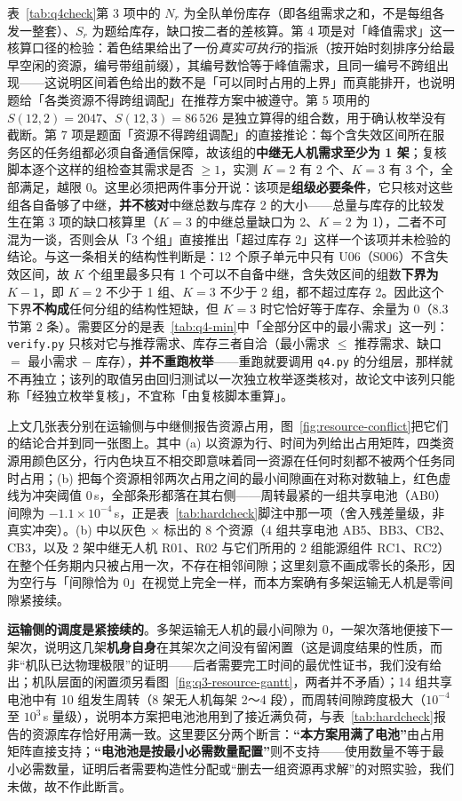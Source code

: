 表~\ref{tab:q4check}第 3 项中的 $N_r$ 为全队单份库存（即各组需求之和，不是每组各发一整套）、$S_r$ 为题给库存，缺口按二者的差核算。第 4 项是对「峰值需求」这一核算口径的检验：着色结果给出了一份\emph{真实可执行}的指派（按开始时刻排序分给最早空闲的资源，编号带组前缀），其编号数恰等于峰值需求，且同一编号不跨组出现——这说明区间着色给出的数不是「可以同时占用的上界」而真能排开，也说明题给「各类资源不得跨组调配」在推荐方案中被遵守。第 5 项用的 $S(12,2)=2047$、$S(12,3)=86\,526$ 是独立算得的组合数，用于确认枚举没有截断。第 7 项是题面「资源不得跨组调配」的直接推论：每个含失效区间所在服务区的任务组都必须自备通信保障，故该组的\textbf{中继无人机需求至少为 1 架}；复核脚本逐个这样的组检查其需求是否 $\ge1$，实测 $K=2$ 有 2 个、$K=3$ 有 3 个，全部满足，越限 0。这里必须把两件事分开说：该项是\textbf{组级必要条件}，它只核对这些组各自备够了中继，\textbf{并不核对}中继总数与库存 2 的大小——总量与库存的比较发生在第 3 项的缺口核算里（$K=3$ 的中继总量缺口为 2、$K=2$ 为 1），二者不可混为一谈，否则会从「3 个组」直接推出「超过库存 2」这样一个该项并未检验的结论。与这一条相关的结构性判断是：12 个原子单元中只有 U06（S006）不含失效区间，故 $K$ 个组里最多只有 1 个可以不自备中继，含失效区间的组数\textbf{下界为 $K-1$}，即 $K=2$ 不少于 1 组、$K=3$ 不少于 2 组，都不超过库存 2。因此这个下界\textbf{不构成}任何分组的结构性短缺，但 $K=3$ 时它恰好等于库存、余量为 0（8.3 节第 2 条）。需要区分的是表~\ref{tab:q4-min}中「全部分区中的最小需求」这一列：\texttt{verify.py} 只核对它与推荐需求、库存三者自洽（最小需求 $\le$ 推荐需求、缺口 $=$ 最小需求 $-$ 库存），\textbf{并不重跑枚举}——重跑就要调用 \texttt{q4.py} 的分组层，那样就不再独立；该列的取值另由回归测试以一次独立枚举逐类核对，故论文中该列只能称「经独立枚举复核」，不宜称「由复核脚本重算」。

上文几张表分别在运输侧与中继侧报告资源占用，图~\ref{fig:resource-conflict}把它们的结论合并到同一张图上。其中 (a) 以资源为行、时间为列给出占用矩阵，四类资源用颜色区分，行内色块互不相交即意味着同一资源在任何时刻都不被两个任务同时占用；(b) 把每个资源相邻两次占用之间的最小间隙画在对称对数轴上，红色虚线为冲突阈值 $0$\,s，全部条形都落在其右侧——周转最紧的一组共享电池（AB0）间隙为 $-1.1\times10^{-4}$\,s，正是表~\ref{tab:hardcheck}脚注中那一项（舍入残差量级，非真实冲突）。(b) 中以灰色 × 标出的 8 个资源（4 组共享电池 AB5、BB3、CB2、CB3，以及 2 架中继无人机 R01、R02 与它们所用的 2 组能源组件 RC1、RC2）在整个任务期内只被占用一次，不存在相邻间隙；这里刻意不画成零长的条形，因为空行与「间隙恰为 $0$」在视觉上完全一样，而本方案确有多架运输无人机是零间隙紧接续。

\textbf{运输侧的调度是紧接续的}。多架运输无人机的最小间隙为 $0$，一架次落地便接下一架次，说明这几架\textbf{机身自身}在其架次之间没有留闲置（这是调度结果的性质，而非“机队已达物理极限”的证明——后者需要完工时间的最优性证书，我们没有给出；机队层面的闲置须另看图~\ref{fig:q3-resource-gantt}，两者并不矛盾）；14 组共享电池中有 10 组发生周转（8 架无人机每架 2～4 段），而周转间隙跨度极大（$10^{-4}$ 至 $10^{3}$\,s 量级），说明本方案把电池池用到了接近满负荷，与表~\ref{tab:hardcheck}报告的资源库存恰好用满一致。这里要区分两个断言：\textbf{“本方案用满了电池”}由占用矩阵直接支持；\textbf{“电池池是按最小必需数量配置”}则不支持——使用数量不等于最小必需数量，证明后者需要构造性分配或“删去一组资源再求解”的对照实验，我们未做，故不作此断言。

